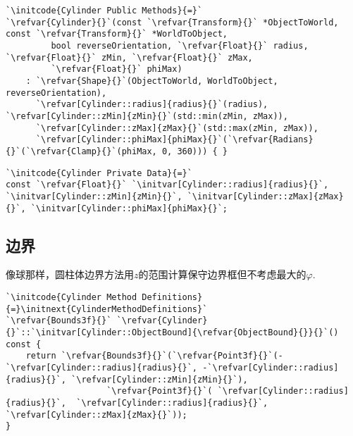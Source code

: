 \begin{lstlisting}
`\initcode{Cylinder Public Methods}{=}`
`\refvar{Cylinder}{}`(const `\refvar{Transform}{}` *ObjectToWorld, const `\refvar{Transform}{}` *WorldToObject,
         bool reverseOrientation, `\refvar{Float}{}` radius, `\refvar{Float}{}` zMin, `\refvar{Float}{}` zMax,
         `\refvar{Float}{}` phiMax)
    : `\refvar{Shape}{}`(ObjectToWorld, WorldToObject, reverseOrientation),
      `\refvar[Cylinder::radius]{radius}{}`(radius), `\refvar[Cylinder::zMin]{zMin}{}`(std::min(zMin, zMax)),
      `\refvar[Cylinder::zMax]{zMax}{}`(std::max(zMin, zMax)),
      `\refvar[Cylinder::phiMax]{phiMax}{}`(`\refvar{Radians}{}`(`\refvar{Clamp}{}`(phiMax, 0, 360))) { }
\end{lstlisting}
\begin{lstlisting}
`\initcode{Cylinder Private Data}{=}`
const `\refvar{Float}{}` `\initvar[Cylinder::radius]{radius}{}`, `\initvar[Cylinder::zMin]{zMin}{}`, `\initvar[Cylinder::zMax]{zMax}{}`, `\initvar[Cylinder::phiMax]{phiMax}{}`;
\end{lstlisting}

\subsection{边界}\label{sub:边界3}
像球那样，圆柱体边界方法用$z$的范围计算保守边界框但不考虑最大的$\varphi$.
\begin{lstlisting}
`\initcode{Cylinder Method Definitions}{=}\initnext{CylinderMethodDefinitions}`
`\refvar{Bounds3f}{}` `\refvar{Cylinder}{}`::`\initvar[Cylinder::ObjectBound]{\refvar{ObjectBound}{}}{}`() const {
    return `\refvar{Bounds3f}{}`(`\refvar{Point3f}{}`(-`\refvar[Cylinder::radius]{radius}{}`, -`\refvar[Cylinder::radius]{radius}{}`, `\refvar[Cylinder::zMin]{zMin}{}`),
                    `\refvar{Point3f}{}`( `\refvar[Cylinder::radius]{radius}{}`,  `\refvar[Cylinder::radius]{radius}{}`, `\refvar[Cylinder::zMax]{zMax}{}`));
}
\end{lstlisting}

